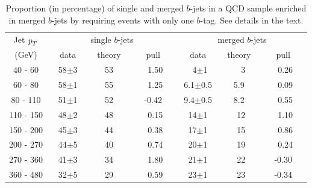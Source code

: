 \begin{table}[!hbt] %
\renewcommand{\arraystretch}{1.2}
\centering
\begin{tabular}{ | c || c | c | c || c | c | c ||}
  \hline
  Jet ${\emph{p}_{T}}$ & \multicolumn{3}{c||}{single $b$-jets}& \multicolumn{3}{c||}{merged $b$-jets}\\ \cline{2-7}
    (GeV) & ~~data~~ & ~theory~ & ~~~pull~~~ & ~~data~~ & ~theory~ & ~~~pull~~~\\ \hline
   40 - 60   &  58$\pm$3 &  53   &  ~1.50   &  ~4$\pm$1    &  ~~3  &  ~0.26 \\  
   60 - 80   &  58$\pm$1 &  55   &  ~1.25   &  6.1$\pm$0.5  &  5.9  &  ~0.09 \\ 
   80 - 110  &  51$\pm$1 &  52   &  -0.42   &  9.4$\pm$0.5  &  8.2  &  ~0.55 \\ 
  110 - 150  &  48$\pm$2 &  48   &  ~0.15   &  14$\pm$1    &  ~12  &  ~1.10 \\ 
  150 - 200  &  45$\pm$3 &  44   &  ~0.38   &  17$\pm$1    &  ~15  &  ~0.86 \\ 
  200 - 270  &  44$\pm$5 &  40   &  ~0.74   &  20$\pm$1    &  ~19  &  ~0.24 \\ 
  270 - 360  &  41$\pm$3 &  34   &  ~1.80   &  21$\pm$1    &  ~22  &  -0.30 \\ 
  360 - 480  &  32$\pm$5 &  29   &  ~0.59   &  23$\pm$1    &  ~23  &  -0.34 \\ \hline
\end{tabular}
\caption{Proportion (in percentage) of single and merged $b$-jets in a QCD sample enriched in merged $b$-jets by requiring events with only one $b$-tag. See details in the text.}
\label{tb:fitfractions2btagM}
\end{table}


